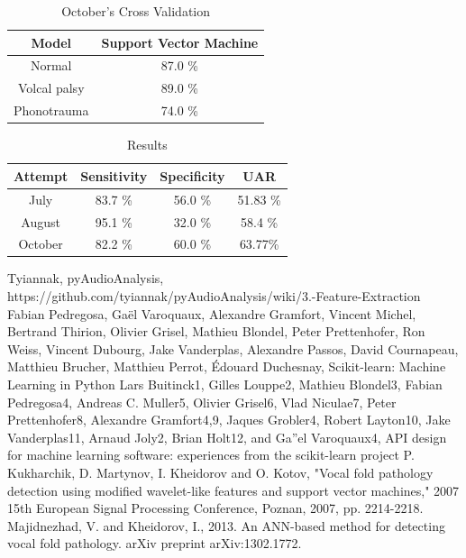 \documentclass[conference]{IEEEtran}
\begin{document}
\begin{table}[htbp]
	\caption{October's Cross Validation}
	\begin{center}
		\begin{tabular}{|c|c|}
			\hline
			Model & Support Vector Machine \\
			\hline
			Normal & 87.0 \% \\
			\hline
			Volcal palsy & 89.0 \% \\
			\hline
			Phonotrauma & 74.0 \% \\
			\hline
		\end{tabular}
		\label{tab2}
	\end{center}
\end{table}



\begin{table}[htbp]
	\caption{Results}
	\begin{center}
		\begin{tabular}{|c|c|c|c|}
			\hline
			Attempt & Sensitivity & Specificity & UAR \\ 
			\hline
			July & 83.7 \% & 56.0 \% & 51.83 \% \\
			\hline
			August & 95.1 \% &  32.0 \% & 58.4 \% \\  
			\hline
			October & 82.2 \% & 60.0 \% & 63.77\% \\
			\hline
		\end{tabular}
		\label{tab3}
	\end{center}
\end{table}
		

\begin{thebibliography}{00}
 Tyiannak, pyAudioAnalysis, https://github.com/tyiannak/pyAudioAnalysis/wiki/3.-Feature-Extraction
 Fabian Pedregosa, Gaël Varoquaux, Alexandre Gramfort, Vincent Michel, Bertrand Thirion, Olivier Grisel, Mathieu Blondel, Peter Prettenhofer, Ron Weiss, Vincent Dubourg, Jake Vanderplas, Alexandre Passos, David Cournapeau, Matthieu Brucher, Matthieu Perrot, Édouard Duchesnay, Scikit-learn: Machine Learning in Python
 Lars Buitinck1, Gilles Louppe2, Mathieu Blondel3, Fabian Pedregosa4, Andreas C. Muller5, Olivier Grisel6, Vlad Niculae7, Peter Prettenhofer8, Alexandre Gramfort4,9, Jaques Grobler4, Robert Layton10, Jake Vanderplas11, Arnaud Joly2, Brian Holt12, and Ga''el Varoquaux4, API design for machine learning software: experiences from the scikit-learn project
P. Kukharchik, D. Martynov, I. Kheidorov and O. Kotov, "Vocal fold pathology detection using modified wavelet-like features and support vector machines," 2007 15th European Signal Processing Conference, Poznan, 2007, pp. 2214-2218.
Majidnezhad, V. and Kheidorov, I., 2013. An ANN-based method for detecting vocal fold pathology. arXiv preprint arXiv:1302.1772.

\end{thebibliography}
\end{document}
